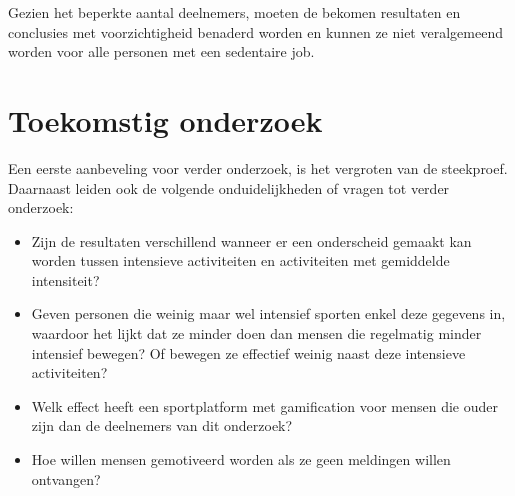 \documentclass[a0,portrait]{hogent-poster}
\begin{document}
\begin{multicols}{2}
Gezien het beperkte aantal deelnemers, moeten de bekomen resultaten en conclusies met voorzichtigheid benaderd worden en kunnen ze niet veralgemeend worden voor alle personen met een sedentaire job.

\section{Toekomstig onderzoek}

Een eerste aanbeveling voor verder onderzoek, is het vergroten van de
steekproef. Daarnaast leiden ook de volgende onduidelijkheden of vragen tot verder onderzoek:

\begin{itemize}
    \item Zijn de resultaten verschillend wanneer er een onderscheid gemaakt kan worden tussen intensieve activiteiten en activiteiten met gemiddelde intensiteit?
    \item Geven personen die weinig maar wel intensief sporten enkel deze gegevens in, waardoor het lijkt dat ze minder doen dan mensen die regelmatig minder intensief bewegen? Of bewegen ze effectief weinig naast deze intensieve activiteiten?
    \item Welk effect heeft een sportplatform met gamification voor mensen die ouder zijn dan de deelnemers van dit onderzoek?
    \item Hoe willen mensen gemotiveerd worden als ze geen meldingen willen ontvangen?
\end{itemize}


\end{multicols}
\end{document}
